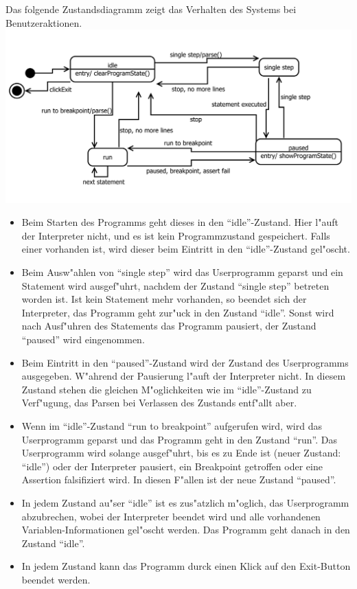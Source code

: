 \documentclass[10pt,a4paper,titlepage]{article}
\begin{document}
Das folgende Zustandsdiagramm zeigt das Verhalten des Systems bei Benutzeraktionen. \\
\includegraphics[scale=0.9]{images/Zustand.pdf}
\begin{itemize}
\item Beim Starten des Programms geht dieses in den "`idle"'-Zustand. Hier l"auft der Interpreter nicht, und es ist kein Programmzustand gespeichert. Falls einer vorhanden ist, wird dieser beim Eintritt in den "`idle"'-Zustand gel"oscht.
\item Beim Ausw"ahlen von "`single step"' wird das Userprogramm geparst und ein Statement wird ausgef"uhrt, nachdem der Zustand "`single step"' betreten worden ist. Ist kein Statement mehr vorhanden, so beendet sich der Interpreter, das Programm geht zur"uck in den Zustand "`idle"'. Sonst wird nach Ausf"uhren des Statements das Programm pausiert, der Zustand "`paused"' wird eingenommen.
\item Beim Eintritt in den "`paused"'-Zustand wird der Zustand des Userprogramms ausgegeben. W"ahrend der Pausierung l"auft der Interpreter nicht. In diesem Zustand stehen die gleichen M"oglichkeiten wie im "`idle"'-Zustand zu Verf"ugung, das Parsen bei Verlassen des Zustands entf"allt aber.
\item Wenn im "`idle"'-Zustand "`run to breakpoint"' aufgerufen wird, wird das Userprogramm geparst und das Programm geht in den Zustand "`run"'. Das Userprogramm wird solange ausgef"uhrt, bis es zu Ende ist (neuer Zustand: "`idle"') oder der Interpreter pausiert, ein Breakpoint getroffen oder eine Assertion falsifiziert wird. In diesen F"allen ist der neue Zustand "`paused"'.
\item In jedem Zustand au"ser "`idle"' ist es zus"atzlich m"oglich, das Userprogramm abzubrechen, wobei der Interpreter beendet wird und alle vorhandenen Variablen-Informationen gel"oscht werden. Das Programm geht danach in den Zustand "`idle"'.
\item In jedem Zustand kann das Programm durck einen Klick auf den Exit-Button beendet werden.
\end{itemize}
\newpage
\end{document}
